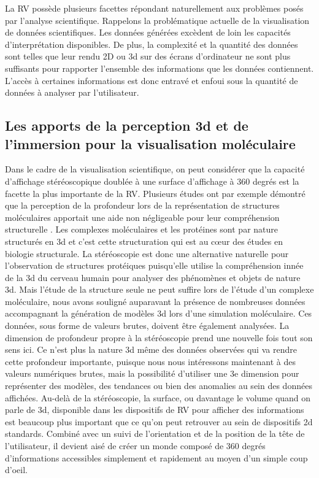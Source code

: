 La RV possède plusieurs facettes répondant naturellement aux problèmes posés par l'analyse scientifique. Rappelons la problématique actuelle de la visualisation de données scientifiques. Les données générées excèdent de loin les capacités d'interprétation disponibles. De plus, la complexité et la quantité des données sont telles que leur rendu 2D ou 3d sur des écrans d'ordinateur ne sont plus suffisants pour rapporter l'ensemble des informations que les données contiennent. L'accès à certaines informations est donc entravé et enfoui sous la quantité de données à analyser par l'utilisateur.

\subsection{Les apports de la perception 3d et de l'immersion pour la visualisation moléculaire}

Dans le cadre de la visualisation scientifique, on peut considérer que la capacité d'affichage stéréoscopique doublée à une surface d'affichage à 360 degrés est la facette la plus importante de la RV. Plusieurs études ont par exemple démontré que la perception de la profondeur lors de la représentation de structures moléculaires apportait une aide non négligeable pour leur compréhension structurelle \cite{van_dam_immersive_2000,stone_immersive_2010,odonoghue_visualization_2010}. Les complexes moléculaires et les protéines sont par nature structurés en 3d et c'est cette structuration qui est au cœur des études en biologie structurale. La stéréoscopie est donc une alternative naturelle pour l'observation de structures protéiques puisqu'elle utilise la compréhension innée de la 3d du cerveau humain pour analyser des phénomènes et objets de nature 3d. 
Mais l'étude de la structure seule ne peut suffire lors de l'étude d'un complexe moléculaire, nous avons souligné auparavant la présence de nombreuses données accompagnant la génération de modèles 3d lors d'une simulation moléculaire. Ces données, sous forme de valeurs brutes, doivent être également analysées. La dimension de profondeur propre à la stéréoscopie prend une nouvelle fois tout son sens ici. Ce n'est plus la nature 3d même des données observées qui va rendre cette profondeur importante, puisque nous nous intéressons maintenant à des valeurs numériques brutes, mais la possibilité d'utiliser une 3e dimension pour représenter des modèles, des tendances ou bien des anomalies au sein des données affichées.
Au-delà de la stéréoscopie, la surface, ou davantage le volume quand on parle de 3d, disponible dans les dispositifs de RV pour afficher des informations est beaucoup plus important que ce qu'on peut retrouver au sein de dispositifs 2d standards. Combiné avec un suivi de l'orientation et de la position de la tête de l'utilisateur, il devient aisé de créer un monde composé de 360 degrés d'informations accessibles simplement et rapidement au moyen d'un simple coup d'oeil.

